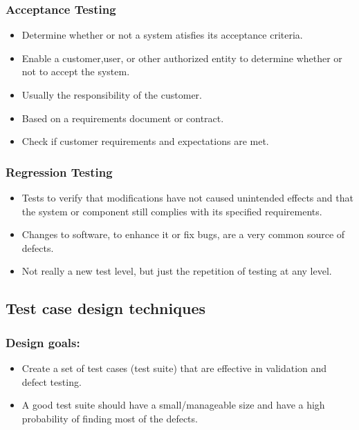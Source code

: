 \documentclass[../ESOF_notes.tex]{subfiles}
\begin{document}
        \subsubsection{Acceptance Testing}
        \begin{itemize}
            \item Determine whether or not a system atisfies its 
            acceptance criteria.
            \item Enable a customer,user, or other authorized entity 
            to determine whether or not to accept the system.
            \item Usually the responsibility of the customer.
            \item Based on a requirements document or contract.
            \item Check if customer requirements and expectations 
            are met.
        \end{itemize}
        \subsubsection{Regression Testing}
            \begin{itemize}
                \item Tests to verify that modifications have not
                caused unintended effects and that the system or 
                component still complies with its specified requirements.
                \item Changes to software, to enhance it or fix bugs,
                are a very common source of defects.
                \item Not really a new test level, but just the repetition
                of testing at any level.
            \end{itemize}
    \subsection{Test case design techniques}
            \subsubsection{Design goals:}
            \begin{itemize}
                \item Create a set of test cases (test suite) that are 
                effective in validation and defect testing.
                \item A good test suite should have a small/manageable 
                size and have a high probability of finding most of the 
                defects.
            \end{itemize}
\end{document}
